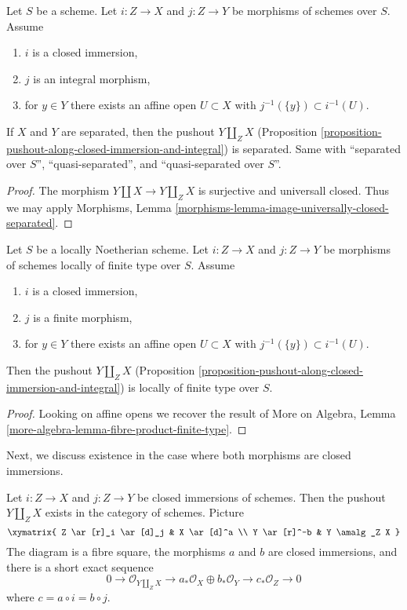 \begin{lemma}
\label{lemma-pushout-separated}
Let $S$ be a scheme. Let $i : Z \to X$ and $j : Z \to Y$
be morphisms of schemes over $S$. Assume
\begin{enumerate}
\item $i$ is a closed immersion,
\item $j$ is an integral morphism,
\item for $y \in Y$ there exists an affine open $U \subset X$
with $j^{-1}(\{y\}) \subset i^{-1}(U)$.
\end{enumerate}
If $X$ and $Y$ are separated, then the pushout $Y \amalg_Z X$
(Proposition \ref{proposition-pushout-along-closed-immersion-and-integral})
is separated. Same with ``separated over $S$'', ``quasi-separated'', and
``quasi-separated over $S$''.
\end{lemma}

\begin{proof}
The morphism $Y \amalg X \to Y \amalg_Z X$ is surjective
and universall closed. Thus we may apply
Morphisms, Lemma \ref{morphisms-lemma-image-universally-closed-separated}.
\end{proof}

\begin{lemma}
\label{lemma-pushout-finite-type}
Let $S$ be a locally Noetherian scheme. Let $i : Z \to X$ and $j : Z \to Y$
be morphisms of schemes locally of finite type over $S$. Assume
\begin{enumerate}
\item $i$ is a closed immersion,
\item $j$ is a finite morphism,
\item for $y \in Y$ there exists an affine open $U \subset X$
with $j^{-1}(\{y\}) \subset i^{-1}(U)$.
\end{enumerate}
Then the pushout $Y \amalg_Z X$
(Proposition \ref{proposition-pushout-along-closed-immersion-and-integral})
is locally of finite type over $S$.
\end{lemma}

\begin{proof}
Looking on affine opens we recover the result of
More on Algebra, Lemma \ref{more-algebra-lemma-fibre-product-finite-type}.
\end{proof}

\noindent
Next, we discuss existence in the case where
both morphisms are closed immersions.

\begin{lemma}
\label{lemma-pushout-along-closed-immersions}
Let $i : Z \to X$ and $j : Z \to Y$ be closed immersions of schemes.
Then the pushout $Y \amalg_Z X$ exists in the category of schemes. Picture
$$
\xymatrix{
Z \ar[r]_i \ar[d]_j & X \ar[d]^a \\
Y \ar[r]^-b & Y \amalg_Z X
}
$$
The diagram is a fibre square, the morphisms $a$ and $b$
are closed immersions, and there is a short exact sequence
$$
0 \to \mathcal{O}_{Y \amalg_Z X} \to
a_*\mathcal{O}_X \oplus b_*\mathcal{O}_Y \to
c_*\mathcal{O}_Z \to 0
$$
where $c = a \circ i = b \circ j$.
\end{lemma}

